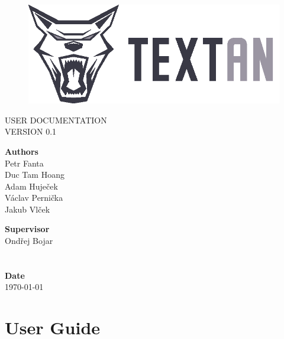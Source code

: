 \documentclass[12pt,a4paper]{report}
\begin{document}
\begin{titlepage}
\BgThispage
{}

\begin{figure}
 \includegraphics{../CommonImages/TEXTAN_logo_grey_B}
\end{figure}
\noindent
\textcolor{TextanRed}{\chapterfont\fontsize{48pt}{1pt}\selectfont\MakeUppercase{User documentation}}\\[15pt]
\textcolor{TextanDarkRed}{\sectionfont\LARGE\MakeUppercase{Version 0.1}}

\vfill
\noindent
\begin{minipage}[b]{.75\textwidth}
\textbf{Authors}\\
Petr Fanta\\
Duc Tam Hoang\\
Adam Huječek\\
Václav Pernička\\
Jakub Vlček
\end{minipage}%
\begin{minipage}[b]{.25\textwidth}
\textbf{Supervisor} \\
Ondřej Bojar\\
\\
\\
\textbf{Date}\\
\today
\end{minipage}

\end{titlepage}
\restoregeometry

\tableofcontents



\chapter{User Guide}
\end{document}
